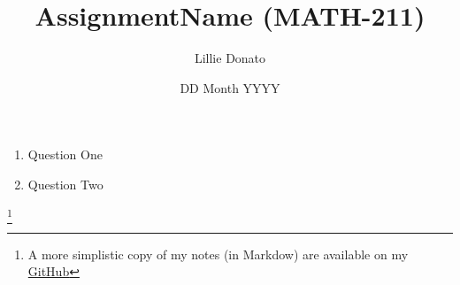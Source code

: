 \documentclass{article}
\title{AssignmentName (MATH-211)}
\author{Lillie Donato}
\date{DD Month YYYY}
\newcommand\blfootnote[1]{
    \begingroup
    \renewcommand\thefootnote{}\footnote{#1}
    \addtocounter{footnote}{-1}
    \endgroup
}
\begin{document}
\maketitle

\begin{enumerate}
    \item Question One
    \item Question Two
\end{enumerate}

\blfootnote{A more simplistic copy of my notes (in Markdow) are available on my \href{https://github.com/onlinechronically/Obsidian-Vault/tree/master/MATH-211}{GitHub}}
\end{document}
